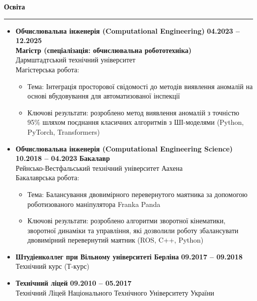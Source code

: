 \documentclass[12pt]{article} %
\newcommand{\HighlightedText}[1] {{\textbf{#1}}}
\newcommand{\PlaceAndTime}[2] {\HighlightedText{#1} \hfill \HighlightedText{#2}}
\newenvironment{ItemizeSection}[1]{
    \vspace{1mm}
    \HighlightedText{#1}
    \vspace{0.5mm}
    {\color{custom_blue} \hrule}
    \begin{itemize}[left=0.5em, topsep=0pt, itemsep=0pt, label={$\bullet$}]
}{
    \end{itemize}
}
\newenvironment{ItemizeSubsection}{
    \begin{itemize}[left=0.5em, topsep=-999pt, itemsep=0pt, label={$\circ$}]
}{
    \end{itemize}
}
\begin{document}
\begin{ItemizeSection}{Освіта}
    \item \PlaceAndTime{Обчислювальна інженерія (Computational Engineering)}{04.2023 -- 12.2025} \\
    \textbf{Магістр (спеціалізація: обчислювальна робототехніка)} \\
    Дармштадтський технічний університет \\
    Магістерська робота:
    \begin{ItemizeSubsection}
        \item Тема: Інтеграція просторової свідомості до методів виявлення аномалій на основі вбудовування для автоматизованої інспекції
        \item Ключові результати: розроблено метод виявлення аномалій з точністю 95\% шляхом поєднання класичних алгоритмів з ШІ-моделями (Python, PyTorch, Transformers)
    \end{ItemizeSubsection}

    \item \PlaceAndTime{Обчислювальна інженерія (Computational Engineering Science)}{10.2018 -- 04.2023}
    \textbf{Бакалавр} \\
    Рейнсько-Вестфальський технічний університет Аахена \\
    Бакалаврська робота:
    \begin{ItemizeSubsection}
        \item Тема: Балансування двовимірного перевернутого маятника за допомогою роботизованого маніпулятора Franka Panda
        \item Ключові результати: розроблено алгоритми зворотної кінематики, зворотної динаміки та управління, які дозволили роботу збалансувати двовимірний перевернутий маятник (ROS, C++, Python)
    \end{ItemizeSubsection}

    \item \PlaceAndTime{Штудіенколлег при Вільному університеті Берліна}{09.2017 -- 09.2018} \\
    Технічний курс (Т-курс)

    \item \PlaceAndTime{Технічний ліцей}{09.2010 -- 05.2017} \\
    Технічний Ліцей Національного Технічного Університету України \\ 
\end{ItemizeSection}
\end{document}
